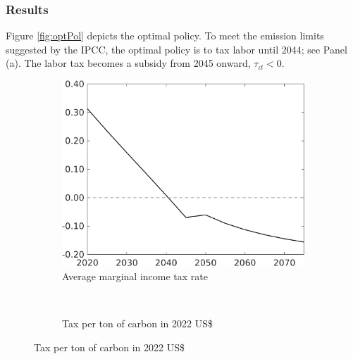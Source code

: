 \subsubsection{Results}\label{sec:optres}
Figure \ref{fig:optPol} depicts the optimal policy.
To meet the emission limits suggested by the IPCC, the optimal policy is to tax labor until 2044; see Panel (a). The labor tax becomes a subsidy from 2045 onward, $\tau_{\iota t}<0$. 
\vspace{3mm}
\begin{figure}[h!!]
	\centering
	\caption{Optimal policy }\label{fig:optPol}
	\begin{subfigure}{0.4\textwidth}
		\caption{Average marginal income tax rate }
		\includegraphics[width=1\textwidth]{../../codding_model/own_basedOnFried/optimalPol_010922_revision/figures/all_13Sept22_Tplus30/dTaulAv_OPT_T_NoTaus_COMPtaul_regime4_spillover0_knspil0_noskill0_sep0_xgrowth0_PV1_etaa0.79_lgd0.png}
	\end{subfigure}
\begin{minipage}[]{0.1\textwidth}
	\
\end{minipage}
	\begin{subfigure}{0.4\textwidth}
		\caption{Tax per ton of carbon in 2022 US\$ }

\end{subfigure}
\end{figure}
